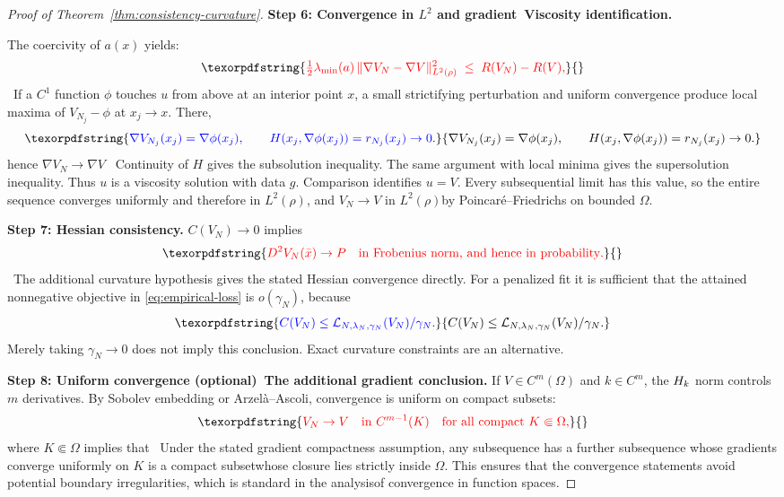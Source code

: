\documentclass[11pt]{article}
\theoremstyle{plain}      %
\theoremstyle{definition} %
\providecommand{\DIFaddtex}[1]{{\protect\color{blue}#1}} %
\providecommand{\DIFdeltex}[1]{{\protect\color{red}#1}} %
\providecommand{\DIFaddbegin}{} %
\providecommand{\DIFaddend}{} %
\providecommand{\DIFdelbegin}{} %
\providecommand{\DIFdelend}{} %
\providecommand{\DIFadd}[1]{\texorpdfstring{\DIFaddtex{#1}}{#1}} %
\providecommand{\DIFdel}[1]{\texorpdfstring{\DIFdeltex{#1}}{}} %
\newcommand{\DIFscaledelfig}{1.0}
\newlength{\DIFdelgraphicswidth} %
\newlength{\DIFdelgraphicsheight} %
\newcommand{\DIFaddincludegraphics}[2][]{{\color{blue}\fbox{\DIFOincludegraphics[#1]{#2}}}} %
\newcommand{\DIFdelincludegraphics}[2][]{%
\sbox{\DIFdelgraphicsbox}{\DIFOincludegraphics[#1]{#2}}%
\settoboxwidth{\DIFdelgraphicswidth}{\DIFdelgraphicsbox} %
\settoboxtotalheight{\DIFdelgraphicsheight}{\DIFdelgraphicsbox} %
\scalebox{\DIFscaledelfig}{%
\parbox[b]{\DIFdelgraphicswidth}{\usebox{\DIFdelgraphicsbox}\\[-\baselineskip] \rule{\DIFdelgraphicswidth}{0em}}\llap{\resizebox{\DIFdelgraphicswidth}{\DIFdelgraphicsheight}{%
\setlength{\unitlength}{\DIFdelgraphicswidth}%
\begin{picture}(1,1)%
\thicklines\linethickness{2pt} %
{\color[rgb]{1,0,0}\put(0,0){\framebox(1,1){}}}%
{\color[rgb]{1,0,0}\put(0,0){\line( 1,1){1}}}%
{\color[rgb]{1,0,0}\put(0,1){\line(1,-1){1}}}%
\end{picture}%
}\hspace*{3pt}}} %
} %
\DeclareRobustCommand{\DIFaddbegin}{\DIFOaddbegin \let\includegraphics\DIFaddincludegraphics} %
\DeclareRobustCommand{\DIFaddend}{\DIFOaddend \let\includegraphics\DIFOincludegraphics} %
\DeclareRobustCommand{\DIFdelbegin}{\DIFOdelbegin \let\includegraphics\DIFdelincludegraphics} %
\DeclareRobustCommand{\DIFdelend}{\DIFOaddend \let\includegraphics\DIFOincludegraphics} %
\begin{document}
\begin{proof}[Proof of Theorem~\ref{thm:consistency-curvature}]
\medskip\noindent\textbf{Step 6: \DIFdelbegin \DIFdel{Convergence in }%
\DIFdel{$L^2$ and gradient}\DIFdelend\ \DIFaddbegin \DIFadd{Viscosity identification}\DIFaddend .}
\DIFdelbegin %

\DIFdel{The coercivity of $a(x)$ yields:
}\[
  \DIFdel{\tfrac12\lambda_{\min}(a)\,
  \|\nabla V_{N}-\nabla V\|^{2}_{L^{2}(\rho)}
  \;\le\; R(V_{N})-R(V),
}\]%
\DIFdelend\ \DIFaddbegin \DIFadd{If a $C^1$ function $\phi$ touches $u$ from above at an interior point $x$, a small strictifying perturbation and uniform convergence produce local maxima of $V_{N_j}-\phi$ at $x_j\to x$. There,
}\[
 \DIFadd{\nabla V_{N_j}(x_j)=\nabla\phi(x_j),\qquad
 H(x_j,\nabla\phi(x_j))=r_{N_j}(x_j)\to0.
}\]\DIFaddend 
\DIFdelbegin \DIFdel{hence $\nabla V_{N} \to \nabla V$ }\DIFdelend\ \DIFaddbegin \DIFadd{Continuity of $H$ gives the subsolution inequality. The same argument with local minima gives the supersolution inequality. Thus $u$ is a viscosity solution with data $g$. Comparison identifies $u=V$. Every subsequential limit has this value, so the entire sequence converges uniformly and therefore }\DIFaddend in \DIFdelbegin \DIFdel{$L^2(\rho)$, and $V_N \to V$ in }\DIFdelend $L^2(\rho)$\DIFdelbegin \DIFdel{by Poincaré–Friedrichs on bounded $\Omega$}\DIFdelend .

\medskip\noindent\textbf{Step 7: Hessian consistency.}
\DIFdelbegin \DIFdel{$C(V_N) \to 0$ implies
}\[
\DIFdel{D^2 V_N(\bar x) \to P \quad \text{in Frobenius norm, and hence in probability}.
}\]%
\DIFdelend\ \DIFaddbegin \DIFadd{The additional curvature hypothesis gives the stated Hessian convergence directly. For a penalized fit it is sufficient that the attained nonnegative objective in \eqref{eq:empirical-loss} is $o(\gamma_N)$, because
}\[
 \DIFadd{C(V_N)\leq\mathcal L_{N,\lambda_N,\gamma_N}(V_N)/\gamma_N.
}\]\DIFaddend 
\DIFaddbegin \DIFadd{Merely taking $\gamma_N\to0$ does not imply this conclusion. Exact curvature constraints are an alternative.
}\DIFaddend 

\medskip\noindent\textbf{Step 8: \DIFdelbegin \DIFdel{Uniform convergence (optional)}\DIFdelend\ \DIFaddbegin \DIFadd{The additional gradient conclusion}\DIFaddend .}
\DIFdelbegin \DIFdel{If $V\in C^m(\Omega)$ and $k\in C^m$, the $\mathcal \mathcal{H}_k$ norm controls $m$ derivatives. By Sobolev embedding or Arzelà–Ascoli, convergence is uniform on compact subsets:
}\[
\DIFdel{V_N \to V \quad \text{in } C^{m-1}(K) \quad \text{for all compact } K \Subset  \Omega,
}\]%
\DIFdel{where $K \Subset \Omega$ implies that }\DIFdelend\ \DIFaddbegin \DIFadd{Under the stated gradient compactness assumption, any subsequence has a further subsequence whose gradients converge uniformly on }\DIFaddend $K$ \DIFdelbegin \DIFdel{is a compact subsetwhose closure lies strictly inside $\Omega$. This ensures that the convergence statements avoid potential boundary irregularities, which is standard in the analysisof convergence in function spaces.
}%


\end{proof}
\end{document}
